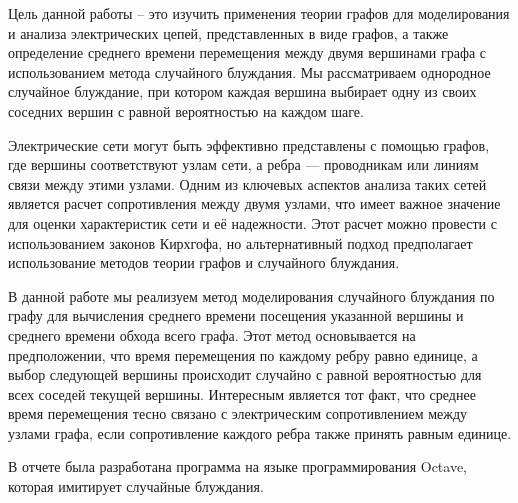 \Introduction

Цель данной работы – это изучить применения теории графов для моделирования и анализа электрических цепей, представленных в виде графов, а также определение среднего времени перемещения между двумя вершинами графа с использованием метода случайного блуждания. Мы рассматриваем однородное случайное блуждание, при котором каждая вершина выбирает одну из своих соседних вершин с равной вероятностью на каждом шаге.

Электрические сети могут быть эффективно представлены с помощью графов, где вершины соответствуют узлам сети, а ребра — проводникам или линиям связи между этими узлами. Одним из ключевых аспектов анализа таких сетей является расчет сопротивления между двумя узлами, что имеет важное значение для оценки характеристик сети и её надежности. Этот расчет можно провести с использованием законов Кирхгофа, но альтернативный подход предполагает использование методов теории графов и случайного блуждания.

В данной работе мы реализуем метод моделирования случайного блуждания по графу для вычисления среднего времени посещения указанной вершины и среднего времени обхода всего графа. Этот метод основывается на предположении, что время перемещения по каждому ребру равно единице, а выбор следующей вершины происходит случайно с равной вероятностью для всех соседей текущей вершины. Интересным является тот факт, что среднее время перемещения тесно связано с электрическим сопротивлением между узлами графа, если сопротивление каждого ребра также принять равным единице.

В отчете была разработана программа на языке программирования Octave, которая имитирует случайные блуждания.